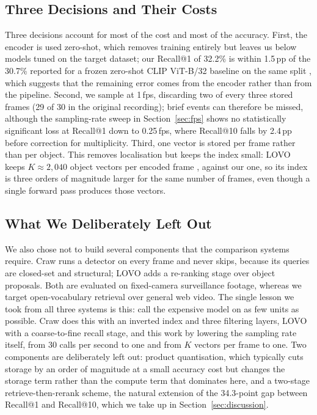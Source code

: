 \documentclass[journal]{IEEEtran}
\begin{document}
\subsection{Three Decisions and Their Costs}
Three decisions account for most of the cost and most of the accuracy. First, the encoder is
used zero-shot, which removes training entirely but leaves us below models tuned on the target
dataset; our Recall@1 of 32.2\% is within 1.5\,pp of the 30.7\% reported for a frozen zero-shot
CLIP ViT-B/32 baseline on the same split \cite{ventura2024learning}, which suggests that the
remaining error comes from the encoder rather than from the pipeline.
Second, we sample at 1\,fps, discarding two of every three stored frames (29 of 30 in the original
recording); brief events can therefore be missed, although the sampling-rate sweep in
Section~\ref{sec:fps} shows no statistically significant loss at Recall@1 down to 0.25\,fps, where
Recall@10 falls by 2.4\,pp before correction for multiplicity. Third, one vector is stored per frame
rather than per object. This removes localisation but keeps the index small: LOVO keeps $K\approx
2{,}040$ object vectors per encoded frame \cite{lovo2025}, against our one, so its index is three
orders of magnitude larger for the same number of frames, even though a single forward pass
produces those vectors.

\subsection{What We Deliberately Left Out}
We also chose not to build several components that the comparison systems require. Craw runs a
detector on every frame and never skips, because its queries are closed-set and structural;
LOVO adds a re-ranking stage over object proposals. Both are evaluated on fixed-camera
surveillance footage, whereas we target open-vocabulary retrieval over general web video. The
single lesson we took from all three systems is this: call the expensive model on as few
units as possible.
Craw does this with an inverted index and three filtering layers, LOVO with a coarse-to-fine
recall stage, and this work by lowering the sampling rate itself, from 30 calls per second to
one and from $K$ vectors per frame to one. Two components are deliberately left out: product
quantisation, which typically cuts storage by an order of magnitude at a small accuracy cost but
changes the storage term rather than the compute term that dominates here, and a two-stage
retrieve-then-rerank scheme, the natural extension of the 34.3-point gap between Recall@1 and
Recall@10, which we take up in Section~\ref{sec:discussion}.
\end{document}
